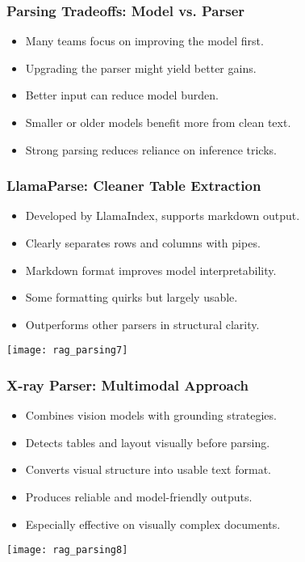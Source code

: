 \begin{frame}[fragile]\frametitle{Parsing Tradeoffs: Model vs. Parser}
  \begin{itemize}
    \item Many teams focus on improving the model first.
    \item Upgrading the parser might yield better gains.
    \item Better input can reduce model burden.
    \item Smaller or older models benefit more from clean text.
    \item Strong parsing reduces reliance on inference tricks.
  \end{itemize}
\end{frame}

\begin{frame}[fragile]\frametitle{LlamaParse: Cleaner Table Extraction}

  \begin{itemize}
    \item Developed by LlamaIndex, supports markdown output.
    \item Clearly separates rows and columns with pipes.
    \item Markdown format improves model interpretability.
    \item Some formatting quirks but largely usable.
    \item Outperforms other parsers in structural clarity.
  \end{itemize}

    \begin{center}
      \texttt{[image: rag\_parsing7]}
    \end{center}

\end{frame}

\begin{frame}[fragile]\frametitle{X-ray Parser: Multimodal Approach}
  \begin{itemize}
    \item Combines vision models with grounding strategies.
    \item Detects tables and layout visually before parsing.
    \item Converts visual structure into usable text format.
    \item Produces reliable and model-friendly outputs.
    \item Especially effective on visually complex documents.
  \end{itemize}
  
    \begin{center}
      \texttt{[image: rag\_parsing8]}
    \end{center}  
\end{frame}

